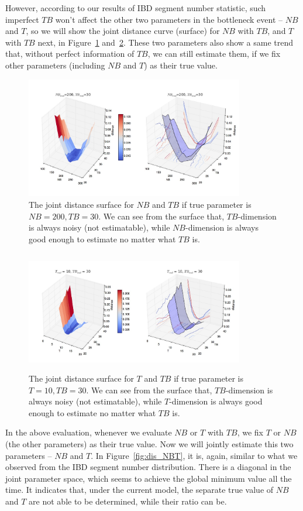 \documentclass{bioinfo}
\begin{document}
However, according to our results of IBD segment number statistic, such imperfect $TB$ won't affect the other two parameters in the bottleneck event -- $NB$ and $T$, so we will show the joint distance curve (surface) for $NB$ with $TB$, and $T$ with $TB$ next, in Figure~\ref{fig:dis_NBTB} and~\ref{fig:dis_TBT}. These two parameters also show a same trend that, without perfect information of $TB$, we can still estimate them, if we fix other parameters (including $NB$ and $T$) as their true value.

\begin{figure}[h]
\centerline{\includegraphics[width=270pt, height=150pt]{like_NBTB.jpg}}
\caption{The joint distance surface for $NB$ and $TB$ if true parameter is $NB=200,TB=30$. We can see from the surface that, $TB$-dimension is always noisy (not estimatable), while $NB$-dimension is always good enough to estimate no matter what $TB$ is.}\label{fig:dis_NBTB}
\end{figure}

\begin{figure}[h]
\centerline{\includegraphics[width=270pt, height=150pt]{like_TBT.jpg}}
\caption{The joint distance surface for $T$ and $TB$ if true parameter is $T=10,TB=30$. We can see from the surface that, $TB$-dimension is always noisy (not estimatable), while $T$-dimension is always good enough to estimate no matter what $TB$ is.}\label{fig:dis_TBT}
\end{figure}

In the above evaluation, whenever we evaluate $NB$ or $T$ with $TB$, we fix $T$ or $NB$ (the other parameters) as their true value. Now we will jointly estimate this two parameters -- $NB$ and $T$. In Figure~\ref{fig:dis_NBT}, it is, again, similar to what we observed from the IBD segment number distribution. There is a diagonal in the joint parameter space, which seems to achieve the global minimum value all the time. It indicates that, under the current model, the separate true value of $NB$ and $T$ are not able to be determined, while their ratio can be.
\end{document}
